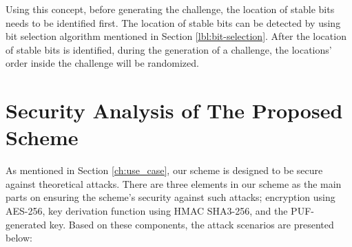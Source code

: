 Using this concept, before generating the challenge, the location of stable bits needs to be identified first. The location of stable bits can be detected by using bit selection algorithm mentioned in Section \ref{lbl:bit-selection}.
After the location of stable bits is identified, during the generation of a challenge, the locations' order inside the challenge will be randomized.

\section{Security Analysis of The Proposed Scheme}
As mentioned in Section \ref{ch:use_case}, our scheme is designed to be secure against theoretical attacks. There are three elements in our scheme as the main parts on ensuring the scheme's security against such attacks; encryption using AES-256, key derivation function using HMAC SHA3-256, and the PUF-generated key. Based on these components, the attack scenarios are presented below:
